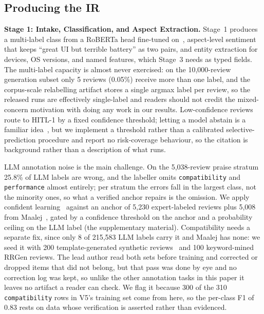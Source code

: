 \documentclass[preprint,12pt]{elsarticle}
\begin{document}
\subsection{Producing the IR}\label{aim1}

\textbf{Stage 1: Intake, Classification, and Aspect Extraction.} Stage~1 produces a multi-label
  class from a RoBERTa head fine-tuned on~\cite{maalej2015bug, guzman2014users}, aspect-level
  sentiment~\cite{guzman2014users} that keeps ``great UI but terrible battery'' as two pairs, and
  entity extraction for devices, OS versions, and named features, which Stage~3 needs as typed
  fields. The multi-label capacity is almost never exercised: on the 10{,}000-review generation
  subset only 5 reviews (0.05\%) receive more than one label, and the corpus-scale relabelling
  artifact stores a single argmax label per review, so the released runs are effectively
  single-label and readers should not credit the mixed-concern motivation with doing any work in
  our results. Low-confidence reviews route to HITL-1 by a fixed confidence threshold; letting a
  model abstain is a familiar idea~\cite{geifman2017selective}, but we implement a threshold
  rather than a calibrated selective-prediction procedure and report no risk-coverage behaviour,
  so the citation is background rather than a description of what runs.

  LLM annotation noise is the main challenge. On the 5{,}038-review praise stratum 25.8\% of LLM
  labels are wrong, and the labeller omits \texttt{compatibility} and \texttt{performance} almost
  entirely; per stratum the errors fall in the largest class, not the minority ones, so what a
  verified anchor repairs is the omission. We apply confident
  learning~\cite{northcutt2021confident} against an anchor of 5{,}230 expert-labeled reviews plus
  5{,}008 from Maalej~\cite{maalej2015bug}, gated by a confidence threshold on the anchor and a
  probability ceiling on the LLM label (the supplementary material). Compatibility needs a
  separate fix, since only 8 of 215{,}583 LLM labels carry it and Maalej has none: we seed it with
  200 template-generated synthetic reviews~\cite{joorabchi2013real} and 100 keyword-mined RRGen
  reviews. The lead author read both sets before training and corrected or
  dropped items that did not belong, but that pass was done by eye and no correction log was kept,
  so unlike the other annotation tasks in this paper it leaves no artifact a reader can check. We
  flag it because 300 of the 310 \texttt{compatibility} rows in V5's training set come from here,
  so the per-class F1 of 0.83 rests on data whose verification is asserted rather than evidenced.
\end{document}
